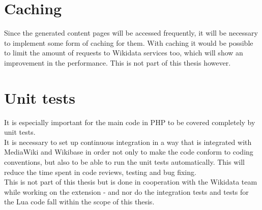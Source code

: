 \section{Caching}
Since the generated content pages will be accessed frequently,  it will be necessary to implement some form of caching for them. With caching it would be possible to limit the amount of requests to Wikidata services too, which will show an improvement in the performance. This is not part of this thesis however.

\section {Unit tests}
It is especially important for the main code in PHP to be covered completely by unit tests. \\
It is necessary to set up continuous integration in a way that is integrated with MediaWiki and Wikibase in order not only to make the code conform to coding conventions, but also to be able to run the unit tests automatically. This will reduce the time spent in code reviews, testing and bug fixing. \\
This is not part of this thesis but is done in cooperation with the Wikidata team while working on the extension - and nor do the integration tests and tests for the Lua code fall within the scope of this thesis. \\ 